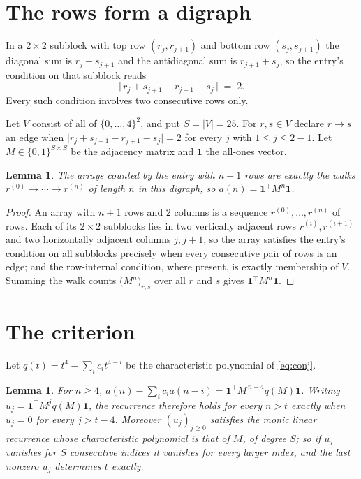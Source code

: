 \documentclass[11pt,a4paper]{article}
\theoremstyle{plain}
\newtheorem{lemma}[theorem]{Lemma}
\theoremstyle{definition}
\begin{document}
\section{The rows form a digraph}

In a $2\times2$ subblock with top row $(r_j,r_{j+1})$ and bottom row $(s_j,s_{j+1})$ the
diagonal sum is $r_j+s_{j+1}$ and the antidiagonal sum is $r_{j+1}+s_j$, so the entry's
condition on that subblock reads
\[
\bigl|\,r_j+s_{j+1}-r_{j+1}-s_j\,\bigr|\;=\;2.
\]
Every such condition involves two consecutive rows only.

Let $V$ consist of all of $\{0,\dots,4\}^{2}$, and put $S=|V|=25$. For $r,s\in V$ declare $r\to s$ an edge
when $\bigl|r_j+s_{j+1}-r_{j+1}-s_j\bigr|=2$ for every $j$ with
$1\le j\le2-1$. Let $M\in\{0,1\}^{S\times S}$ be the adjacency matrix and $\mathbf{1}$
the all-ones vector.

\begin{lemma}\label{lem:walk}
The arrays counted by the entry with $n+1$ rows are exactly the walks
$r^{(0)}\to\cdots\to r^{(n)}$ of length $n$ in this digraph, so
$a(n)=\mathbf{1}^{\!\top}M^{n}\mathbf{1}$.
\end{lemma}

\begin{proof}
An array with $n+1$ rows and $2$ columns is a sequence $r^{(0)},\dots,r^{(n)}$ of
rows. Each of its $2\times2$ subblocks lies in two vertically adjacent rows
$r^{(i)},r^{(i+1)}$ and two horizontally adjacent columns $j,j+1$, so the array satisfies
the entry's condition on all subblocks precisely when every consecutive pair of rows is an
edge; and the row-internal condition, where present, is exactly membership of $V$. Summing
the walk counts $\bigl(M^{n}\bigr)_{r,s}$ over all $r$ and $s$ gives
$\mathbf{1}^{\!\top}M^{n}\mathbf{1}$.
\end{proof}

\section{The criterion}

Let $q(t)=t^{4}-\sum_i c_i t^{4-i}$ be the characteristic polynomial of
\eqref{eq:conj}.

\begin{lemma}\label{lem:crit}
For $n\ge4$,
$a(n)-\sum_i c_i a(n-i)=\mathbf{1}^{\!\top}M^{\,n-4}q(M)\mathbf{1}$. Writing
$u_j=\mathbf{1}^{\!\top}M^{j}q(M)\mathbf{1}$, the recurrence therefore holds for every
$n>t$ exactly when $u_j=0$ for every $j>t-4$. Moreover $(u_j)_{j\ge0}$ satisfies the
monic linear recurrence whose characteristic polynomial is that of $M$, of degree $S$; so
if $u_j$ vanishes for $S$ consecutive indices it vanishes for every larger index, and the
last nonzero $u_j$ determines $t$ exactly.
\end{lemma}
\end{document}
